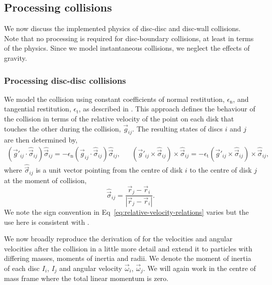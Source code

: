 \documentclass{article}
\begin{document}
\subsection{Processing collisions}
We now discuss the implemented physics of disc-disc and disc-wall collisions. Note that no processing is required for disc-boundary collisions, at least in terms of the physics. Since we model instantaneous collisions, we neglect the effects of gravity.

\subsubsection{Processing disc-disc collisions}
We model the collision using constant coefficients of normal restitution, $\epsilon_\mathrm{n}$, and tangential restitution, $\epsilon_\mathrm{t}$, as described in \cite{Kremer-2014}. This approach defines the behaviour of the collision in terms of the relative velocity of the point on each disk that touches the other during the collision, $\vec{g}_{ij}$. The resulting states of discs $i$ and $j$ are then determined by,
\begin{align}
\label{eq:relative-velocity-relations}
    \left( \vec{g}'_{ij} \cdot \hat{\vec{\sigma}}_{ij} \right) \hat{\vec{\sigma}}_{ij}
    =
    - \epsilon_\mathrm{n} \left( \vec{g}_{ij} \cdot \hat{\vec{\sigma}}_{ij} \right) \hat{\vec{\sigma}}_{ij},
    &&
    \left( \vec{g}'_{ij} \times \hat{\vec{\sigma}}_{ij} \right) \times \hat{\vec{\sigma}}_{ij}
    =
    - \epsilon_\mathrm{t} \left( \vec{g}'_{ij} \times \hat{\vec{\sigma}}_{ij} \right) \times \hat{\vec{\sigma}}_{ij},
\end{align}
where $\hat{\vec{\sigma}}_{ij}$ is a unit vector pointing from the centre of disk $i$ to the centre of disk $j$ at the moment of collision,
\begin{equation}
    \hat{\vec{\sigma}}_{ij} = \frac{\vec{r}_j - \vec{r}_i}{|\vec{r}_j - \vec{r}_i|}.
\end{equation}
We note the sign convention in Eq~\ref{eq:relative-velocity-relations} varies but the use here is consistent with \cite{Kremer-2014}.

We now broadly reproduce the derivation of \cite{Kremer-2014} for the velocities and angular velocities after the collision in a little more detail and extend it to particles with differing masses, moments of inertia and radii. We denote the moment of inertia of each disc $I_i$, $I_j$ and angular velocity $\vec{\omega}_i$, $\vec{\omega}_j$. We will again work in the centre of mass frame where the total linear momentum is zero.
\end{document}
